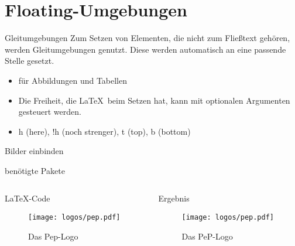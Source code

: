 \section{Floating-Umgebungen}

\begin{frame}{Gleitumgebungen}
  Zum Setzen von Elementen, die nicht zum Fließtext gehören, werden Gleitumgebungen genutzt.
  Diese werden automatisch an eine passende Stelle gesetzt.
  \begin{itemize}
    \item für Abbildungen und Tabellen
    \item Die Freiheit, die \LaTeX \ beim Setzen hat, kann mit optionalen Argumenten gesteuert werden.
    \item h (here), !h (noch strenger), t (top), b (bottom)
  \end{itemize}
\end{frame}

\begin{frame}[fragile]{Bilder einbinden}
  \begin{block}{benötigte Pakete}
    \begin{lstverbatim}
    \usepackage{graphicx}
    \usepackage[labelfont=bf]{caption}
    \end{lstverbatim}
  \end{block}
  \begin{columns}[T]
    \begin{column}{0.6\textwidth}
      \begin{block}{\LaTeX-Code}
        \begin{lstverbatim}
        \begin{figure}
          \centering
          \texttt{[image: logos/pep.pdf]}
          \caption{Das Pep-Logo}
          \label{fig:peplogo}
        \end{figure}
        \end{lstverbatim}
      \end{block}
    \end{column}
    \begin{column}{0.35\textwidth}
      \begin{block}{Ergebnis}
        \begin{figure}
          \centering
          \texttt{[image: logos/pep.pdf]}
          \caption{Das PeP-Logo}
          \label{fig:peplogo}
        \end{figure}
      \end{block}
    \end{column}
  \end{columns}
\end{frame}
